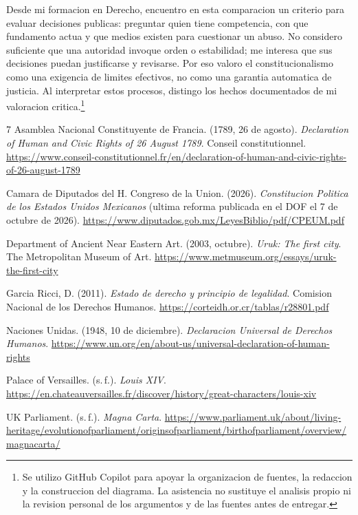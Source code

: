 \documentclass[spanish,letterpaper,oneside]{article}
\begin{document}
Desde mi formacion en Derecho, encuentro en esta comparacion un criterio
para evaluar decisiones publicas: preguntar quien tiene competencia,
con que fundamento actua y que medios existen para cuestionar un abuso.
No considero suficiente que una autoridad invoque orden o estabilidad;
me interesa que sus decisiones puedan justificarse y revisarse.
Por eso valoro el constitucionalismo como una exigencia de limites
efectivos, no como una garantia automatica de justicia.
Al interpretar estos procesos, distingo los hechos documentados de mi
valoracion critica.\footnote{Se utilizo GitHub Copilot para apoyar
la organizacion de fuentes, la redaccion y la construccion del diagrama.
La asistencia no sustituye el analisis propio ni la revision personal
de los argumentos y de las fuentes antes de entregar.}

\clearpage
\begin{thebibliography}{7}
Asamblea Nacional Constituyente de Francia. (1789, 26 de agosto).
\emph{Declaration of Human and Civic Rights of 26 August 1789}.
Conseil constitutionnel.
\url{https://www.conseil-constitutionnel.fr/en/declaration-of-human-and-civic-rights-of-26-august-1789}

Camara de Diputados del H. Congreso de la Union. (2026).
\emph{Constitucion Politica de los Estados Unidos Mexicanos}
(ultima reforma publicada en el DOF el 7 de octubre de 2026).
\url{https://www.diputados.gob.mx/LeyesBiblio/pdf/CPEUM.pdf}

Department of Ancient Near Eastern Art. (2003, octubre).
\emph{Uruk: The first city}. The Metropolitan Museum of Art.
\url{https://www.metmuseum.org/essays/uruk-the-first-city}

Garcia Ricci, D. (2011). \emph{Estado de derecho y principio de legalidad}.
Comision Nacional de los Derechos Humanos.
\url{https://corteidh.or.cr/tablas/r28801.pdf}

Naciones Unidas. (1948, 10 de diciembre).
\emph{Declaracion Universal de Derechos Humanos}.
\url{https://www.un.org/en/about-us/universal-declaration-of-human-rights}

Palace of Versailles. (s.\,f.). \emph{Louis XIV}.
\url{https://en.chateauversailles.fr/discover/history/great-characters/louis-xiv}

UK Parliament. (s.\,f.). \emph{Magna Carta}.
\url{https://www.parliament.uk/about/living-heritage/evolutionofparliament/originsofparliament/birthofparliament/overview/magnacarta/}
\end{thebibliography}
\end{document}
